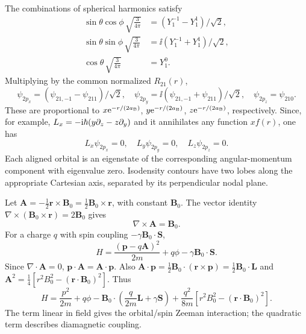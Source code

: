 The combinations of spherical harmonics satisfy
\begin{align}
\sin\theta\cos\phi\,\sqrt{\frac{3}{4\pi}}
&=(Y_1^{-1}-Y_1^1)/\sqrt2,\\
\sin\theta\sin\phi\,\sqrt{\frac{3}{4\pi}}
&=\ii(Y_1^{-1}+Y_1^1)/\sqrt2,\\
\cos\theta\,\sqrt{\frac{3}{4\pi}}&=Y_1^0.
\end{align}
Multiplying by the common normalized $R_{21}(r)$,
\begin{equation}
\boxed{\psi_{2p_x}=
(\psi_{21,-1}-\psi_{211})/\sqrt2,\quad
\psi_{2p_y}=
\ii(\psi_{21,-1}+\psi_{211})/\sqrt2,\quad
\psi_{2p_z}=\psi_{210}}.
\end{equation}
These are proportional to
$x\mathrm e^{-r/(2a_{\mathrm B})}$, $y\mathrm e^{-r/(2a_{\mathrm B})}$,
$z\mathrm e^{-r/(2a_{\mathrm B})}$, respectively.
Since, for example,
$L_x=-\mathrm i\hbar(y\partial_z-z\partial_y)$
and it annihilates any function
$x f(r)$, one has
\begin{equation}
\boxed{L_x\psi_{2p_x}=0,\quad
L_y\psi_{2p_y}=0,\quad
L_z\psi_{2p_z}=0}.
\end{equation}
Each aligned orbital is an eigenstate of
the corresponding angular-momentum component
with eigenvalue zero. Isodensity contours have
two lobes along the appropriate Cartesian axis,
separated by its perpendicular nodal plane.

Let $\mathbf A=-\frac12\mathbf r\times\mathbf B_0
=\frac12\mathbf B_0\times\mathbf r$,
with constant $\mathbf B_0$.
The vector identity
$\nabla\times(\mathbf B_0\times\mathbf r)=
2\mathbf B_0$ gives
\begin{equation}
\boxed{\nabla\times\mathbf A=\mathbf B_0}.
\end{equation}
For a charge $q$ with spin coupling
$-\gamma\mathbf B_0\cdot\mathbf S$,
\begin{equation}
H=\frac{(\mathbf p-q\mathbf A)^2}{2m}
+q\phi-\gamma\mathbf B_0\cdot\mathbf S.
\end{equation}
Since $\nabla\cdot\mathbf A=0$,
$\mathbf p\cdot\mathbf A=\mathbf A\cdot\mathbf p$.
Also
$\mathbf A\cdot\mathbf p=
\frac12\mathbf B_0\cdot(\mathbf r\times\mathbf p)
=\frac12\mathbf B_0\cdot\mathbf L$
and
$\mathbf A^2=\frac14
[r^2B_0^2-(\mathbf r\cdot\mathbf B_0)^2]$.
Thus
\begin{equation}
\boxed{
H=\frac{p^2}{2m}+q\phi
-\mathbf B_0\cdot\left(\frac q{2m}\mathbf L+
\gamma\mathbf S\right)
+\frac{q^2}{8m}
[r^2B_0^2-(\mathbf r\cdot\mathbf B_0)^2]}.
\end{equation}
The term linear in field gives
the orbital/spin Zeeman interaction;
the quadratic term describes
diamagnetic coupling.

